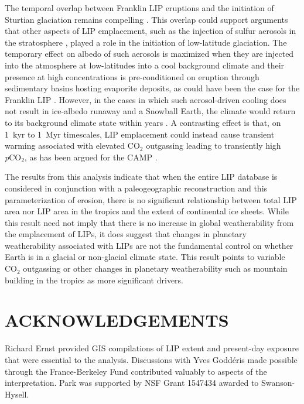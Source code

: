 \documentclass[11pt,letterpaper]{article}
\begin{document}
The temporal overlap between Franklin LIP eruptions and the initiation of Sturtian glaciation remains compelling \citep{Macdonald2010a, MacLennan2018a}. This overlap could support arguments that other aspects of LIP emplacement, such as the injection of sulfur aerosols in the stratosphere \citep{Macdonald2017a}, played a role in the initiation of low-latitude glaciation. The temporary effect on albedo of such aerosols is maximized when they are injected into the atmosphere at low-latitudes into a cool background climate and their presence at high concentrations is pre-conditioned on eruption through sedimentary basins hosting evaporite deposits, as could have been the case for the Franklin LIP \citep{Macdonald2017a}. However, in the cases in which such aerosol-driven cooling does not result in ice-albedo runaway and a Snowball Earth, the climate would return to its background climate state within years \citep{Macdonald2017a}. A contrasting effect is that, on 1~kyr to 1~Myr timescales, LIP emplacement could instead cause transient warming associated with elevated CO$_{2}$ outgassing leading to transiently high \textit{p}CO$_{2}$, as has been argued for the CAMP \citep{Schaller2011a, Schaller2012a}.

The results from this analysis indicate that when the entire LIP database is considered in conjunction with a paleogeographic reconstruction and this parameterization of erosion, there is no significant relationship between total LIP area nor LIP area in the tropics and the extent of continental ice sheets. While this result need not imply that there is no increase in global weatherability from the emplacement of LIPs, it does suggest that changes in planetary weatherability associated with LIPs are not the fundamental control on whether Earth is in a glacial or non-glacial climate state. This result points to variable CO$_{2}$ outgassing or other changes in planetary weatherability such as mountain building in the tropics as more significant drivers.

\section*{ACKNOWLEDGEMENTS \label{sec:ACKNOWLEDGEMENTS}}

Richard Ernst provided GIS compilations of LIP extent and present-day exposure that were essential to the analysis. Discussions with Yves Godd\'eris made possible through the France-Berkeley Fund contributed valuably to aspects of the interpretation. Park was supported by NSF Grant 1547434 awarded to Swanson-Hysell.
\end{document}
